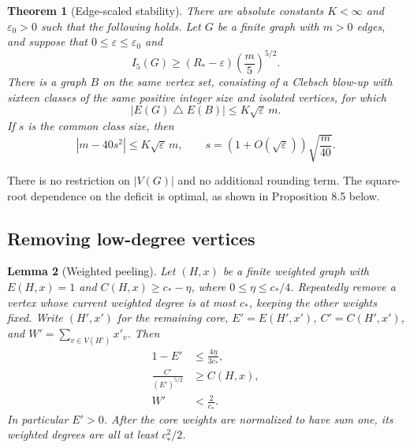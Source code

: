 \documentclass[11pt]{amsart}
\newtheorem{theorem}{Theorem}[section]
\newtheorem{lemma}[theorem]{Lemma}
\theoremstyle{definition}
\theoremstyle{remark}
\begin{document}
\begin{theorem}[Edge-scaled stability]\label{thm:edge-stability}
There are absolute constants $K<\infty$ and $\varepsilon_0>0$ such that the
following holds. Let $G$ be a finite graph with $m>0$ edges, and suppose that
$0\leq\varepsilon\leq\varepsilon_0$ and
\[
 I_5(G)\geq(R_\ast-\varepsilon)\left(\frac m5\right)^{5/2}.
\]
There is a graph $B$ on the same vertex set, consisting of a Clebsch blow-up
with sixteen classes of the same positive integer size and isolated
vertices, for which
\[
 |E(G)\mathbin{\triangle}E(B)|\leq K\sqrt\varepsilon\,m.
\]
If $s$ is the common class size, then
\[
 |m-40s^2|\leq K\sqrt\varepsilon\,m,\qquad
 s=(1+O(\sqrt\varepsilon))\sqrt{\frac m{40}}.
\]
\end{theorem}

There is no restriction on $|V(G)|$ and no additional rounding term. The
square-root dependence on the deficit is optimal, as shown in Proposition
8.5 below.

\subsection{Removing low-degree vertices}

\begin{lemma}[Weighted peeling]\label{lem:peeling}
Let $(H,x)$ be a finite weighted graph with $E(H,x)=1$ and
$C(H,x)\geq c_\ast-\eta$, where $0\leq\eta\leq c_\ast/4$. Repeatedly remove
a vertex whose current weighted degree is at most $c_\ast$, keeping the
other weights fixed. Write $(H',x')$ for the remaining core,
$E'=E(H',x')$, $C'=C(H',x')$, and
$W'=\sum_{v\in V(H')}x'_v$. Then
\begin{align}
 1-E'&\leq\frac{4\eta}{3c_\ast},\tag{37}\label{eq:37}\\
 \frac{C'}{(E')^{5/2}}&\geq C(H,x),\tag{38}\label{eq:38}\\
 W'&<\frac2{c_\ast}.\tag{39}\label{eq:39}
\end{align}
In particular $E'>0$. After the core weights are normalized to have sum one,
its weighted degrees are all at least $c_\ast^2/2$.
\end{lemma}
\end{document}
